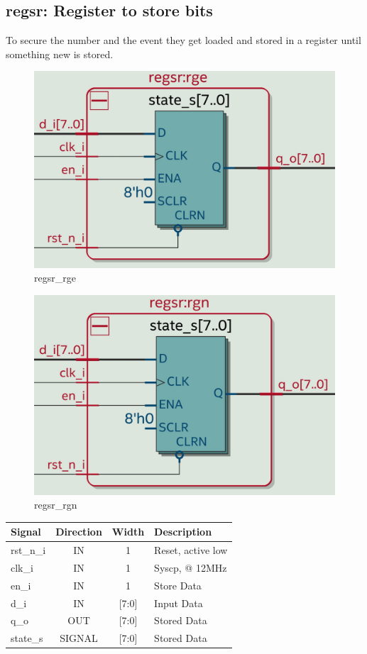 \documentclass[12pt,a4 paper] {report}
\begin{document}
\subsection{regsr: Register to store bits}
To secure the number and the event they get loaded and stored in a register until something new is stored.
\begin{figure}[h]
	\centering	
	\includegraphics[scale=0.12]{../png/regsr_rge.png}
	\caption{regsr\_rge}
\end{figure}
\begin{figure}[h]
	\centering	
	\includegraphics[scale=0.12]{../png/regsr_rgn.png}
	\caption{regsr\_rgn}
\end{figure}
\begin{center}
	\begin{tabular}{ | p{2cm} | c | c | p{5cm} |}
		\hline
		\textbf{Signal} & \textbf{Direction} & \textbf{Width} & \textbf{Description} \\
		\hline
		\hline
 		rst\_n\_i & IN & 1 & Reset, active low \\
 		\hline
		clk\_i & IN & 1 & Syscp, @ 12MHz \\
		\hline
		en\_i & IN & 1 & Store Data \\
		\hline
		d\_i & IN & [7:0] & Input Data \\
		\hline
		q\_o & OUT & [7:0] & Stored Data \\
		\hline
		\hline
		state\_s & SIGNAL & [7:0] & Stored Data \\
		\hline
	\end{tabular}
\end{center}
\end{document}
